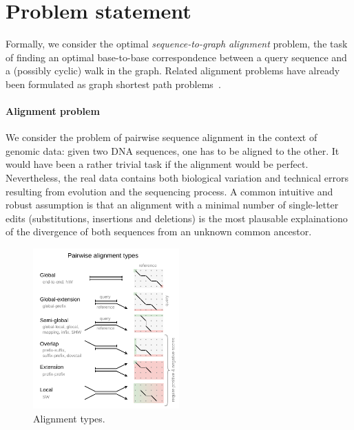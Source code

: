 \section*{Problem statement}

Formally, we consider the optimal \emph{sequence-to-graph alignment} problem,
the task of finding an optimal base-to-base correspondence between a query
sequence and a (possibly cyclic) walk in the graph. Related alignment problems
have already been formulated as graph shortest path
problems~\cite{jain_complexity_2019}.

\paragraph{Alignment problem}
We consider the problem of pairwise sequence alignment in the context of genomic
data: given two DNA sequences, one has to be aligned to the other. It would have
been a rather trivial task if the alignment would be perfect. Nevertheless, the
real data contains both biological variation and technical errors resulting from
evolution and the sequencing process. A common intuitive and robust assumption
is that an alignment with a minimal number of single-letter edits
(substitutions, insertions and deletions) is the most plausable explainationo of
the divergence of both sequences from an unknown common ancestor.

\begin{figure}[t]  %
    \includegraphics[width=0.5\textwidth]{alignment-types}
	\caption[Alignment types]{Alignment types.}
    \label{fig:alignment-types}
\end{figure}


